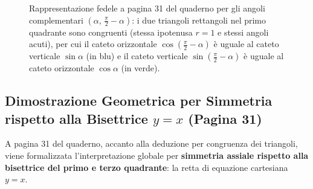 \documentclass[11pt,a4paper,oneside]{report}
\begin{document}
\begin{figure}[htbp]
\caption{Rappresentazione fedele a pagina 31 del quaderno per gli angoli complementari $\left(\alpha, \, \frac{\pi}{2} - \alpha\right)$: i due triangoli rettangoli nel primo quadrante sono congruenti (stessa ipotenusa $r = 1$ e stessi angoli acuti), per cui il cateto orizzontale $\cos\left(\frac{\pi}{2} - \alpha\right)$ è uguale al cateto verticale $\sin\alpha$ (in blu) e il cateto verticale $\sin\left(\frac{\pi}{2} - \alpha\right)$ è uguale al cateto orizzontale $\cos\alpha$ (in verde).}
\label{fig:angoli_complementari}
\end{figure}

\subsection{Dimostrazione Geometrica per Simmetria rispetto alla Bisettrice $y = x$ (Pagina 31)}
A pagina 31 del quaderno, accanto alla deduzione per congruenza dei triangoli, viene formalizzata l'interpretazione globale per \textbf{simmetria assiale rispetto alla bisettrice del primo e terzo quadrante}: la retta di equazione cartesiana $y = x$.
\end{document}

